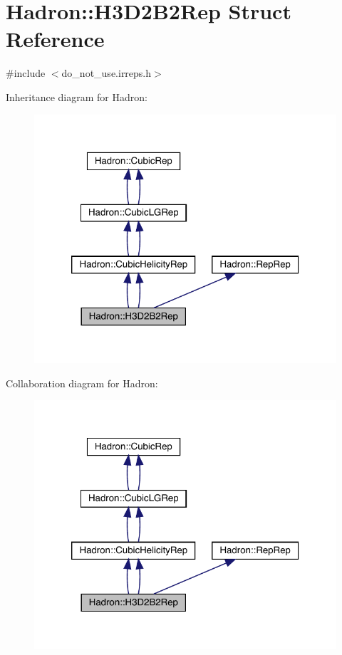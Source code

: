 \hypertarget{structHadron_1_1H3D2B2Rep}{}\section{Hadron\+:\+:H3\+D2\+B2\+Rep Struct Reference}
\label{structHadron_1_1H3D2B2Rep}


{\ttfamily \#include $<$do\+\_\+not\+\_\+use.\+irreps.\+h$>$}



Inheritance diagram for Hadron\+:\nopagebreak
\begin{figure}[H]
\begin{center}
\leavevmode
\includegraphics[width=320pt]{d6/d4a/structHadron_1_1H3D2B2Rep__inherit__graph}
\end{center}
\end{figure}


Collaboration diagram for Hadron\+:\nopagebreak
\begin{figure}[H]
\begin{center}
\leavevmode
\includegraphics[width=320pt]{dc/d4b/structHadron_1_1H3D2B2Rep__coll__graph}
\end{center}
\end{figure}

